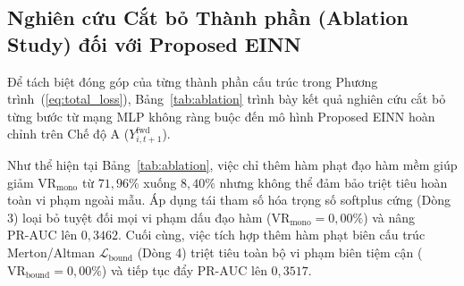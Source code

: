 \documentclass[11pt,a4paper]{article}
\begin{document}
\subsection{Nghiên cứu Cắt bỏ Thành phần (Ablation Study) đối với Proposed EINN}
Để tách biệt đóng góp của từng thành phần cấu trúc trong Phương trình~(\ref{eq:total_loss}), Bảng~\ref{tab:ablation} trình bày kết quả nghiên cứu cắt bỏ từng bước từ mạng MLP không ràng buộc đến mô hình Proposed EINN hoàn chỉnh trên Chế độ A ($Y_{i,t+1}^{\text{fwd}}$).

\begin{table}[t!]
\centering
\caption{Nghiên cứu cắt bỏ (Ablation study) các thành phần cấu trúc của Proposed EINN trên tập kiểm tra ngoài mẫu ($Y_{i,t+1}^{\text{fwd}}$, $N_{\text{test}}=2.083$).}
\label{tab:ablation}
\footnotesize
\renewcommand{\arraystretch}{1.15}
\vspace{-0.4em}
\end{table}

Như thể hiện tại Bảng~\ref{tab:ablation}, việc chỉ thêm hàm phạt đạo hàm mềm giúp giảm $\text{VR}_{\text{mono}}$ từ $71,96\%$ xuống $8,40\%$ nhưng không thể đảm bảo triệt tiêu hoàn toàn vi phạm ngoài mẫu. Áp dụng tái tham số hóa trọng số softplus cứng (Dòng 3) loại bỏ tuyệt đối mọi vi phạm dấu đạo hàm ($\text{VR}_{\text{mono}} = 0,00\%$) và nâng $\text{PR-AUC}$ lên $0,3462$. Cuối cùng, việc tích hợp thêm hàm phạt biên cấu trúc Merton/Altman $\mathcal{L}_{\text{bound}}$ (Dòng 4) triệt tiêu toàn bộ vi phạm biên tiệm cận ($\text{VR}_{\text{bound}} = 0,00\%$) và tiếp tục đẩy $\text{PR-AUC}$ lên $0,3517$.
\end{document}
